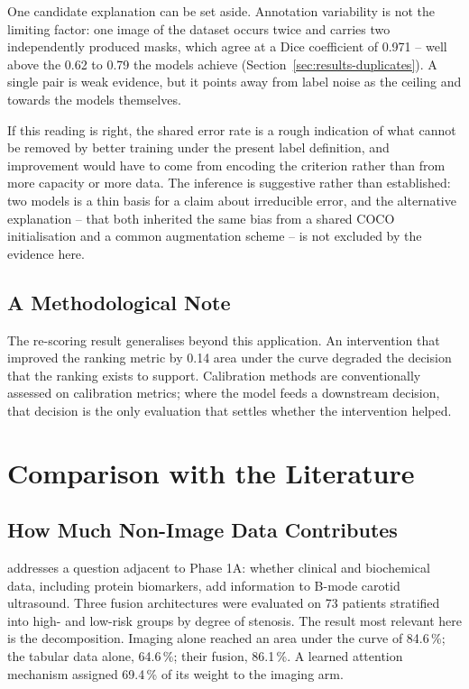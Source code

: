One candidate explanation can be set aside. Annotation variability is not the limiting factor:
one image of the dataset occurs twice and carries two independently produced masks, which agree
at a Dice coefficient of 0.971 -- well above the 0.62 to 0.79 the models achieve
(Section~\ref{sec:results-duplicates}). A single pair is weak evidence, but it points away from label noise as the
ceiling and towards the models themselves.

If this reading is right, the shared error rate is a rough indication of what cannot be removed
by better training under the present label definition, and improvement would have to come from
encoding the criterion rather than from more capacity or more data. The inference is suggestive
rather than established: two models is a thin basis for a claim about irreducible error, and the
alternative explanation -- that both inherited the same bias from a shared COCO initialisation
and a common augmentation scheme -- is not excluded by the evidence here.

\subsection{A Methodological Note}

The re-scoring result generalises beyond this application. An intervention that improved the
ranking metric by 0.14 area under the curve degraded the decision that the ranking exists to
support. Calibration methods are conventionally assessed on calibration metrics; where the model
feeds a downstream decision, that decision is the only evaluation that settles whether the
intervention helped.

\section{Comparison with the Literature}
\label{sec:discussion-literature}

\subsection{How Much Non-Image Data Contributes}

\textcite{stamos2025} addresses a question adjacent to Phase 1A: whether clinical and biochemical
data, including protein biomarkers, add information to B-mode carotid ultrasound. Three fusion
architectures were evaluated on 73 patients stratified into high- and low-risk groups by degree
of stenosis. The result most relevant here is the decomposition. Imaging alone reached an area
under the curve of 84.6\,\%; the tabular data alone, 64.6\,\%; their fusion, 86.1\,\%. A learned
attention mechanism assigned 69.4\,\% of its weight to the imaging arm.

